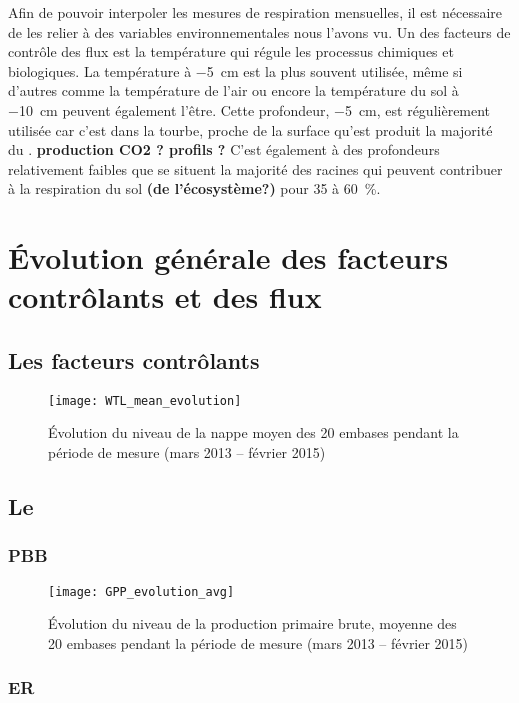 Afin de pouvoir interpoler les mesures de respiration mensuelles, il est nécessaire de les relier à des variables environnementales nous l'avons vu.
Un des facteurs de contrôle des flux est la température qui régule les processus chimiques et biologiques.
La température à \SI{-5}{\cm} est la plus souvent utilisée, même si d'autres comme la température de l'air ou encore la température du sol à \SI{-10}{\cm} peuvent également l'être.
Cette profondeur, \SI{-5}{\cm}, est régulièrement utilisée car c'est dans la tourbe, proche de la surface qu'est produit la majorité du \coo.
\textbf{production CO2 ? profils ?}
C'est également à des profondeurs relativement faibles que se situent la majorité des racines \plop qui peuvent contribuer à la respiration du sol \textbf{(de l'écosystème?)} pour 35 à \SI{60}{\percent}.

\section{Évolution générale des facteurs contrôlants et des flux}

\subsection{Les facteurs contrôlants}

\begin{figure}
\centering
\texttt{[image: WTL\_mean\_evolution]}
\caption{Évolution du niveau de la nappe moyen des 20 embases pendant la période de mesure (mars 2013 -- février 2015)}
\label{fig:WTL_mean_evolution}
\end{figure}

\subsection{Le \coo}

\subsubsection{PBB}

\begin{figure}
\centering
\texttt{[image: GPP\_evolution\_avg]}
\caption{Évolution du niveau de la production primaire brute, moyenne des 20 embases pendant la période de mesure (mars 2013 -- février 2015)}
\label{fig:GPP_evolution_avg}
\end{figure}

\subsubsection{ER}

